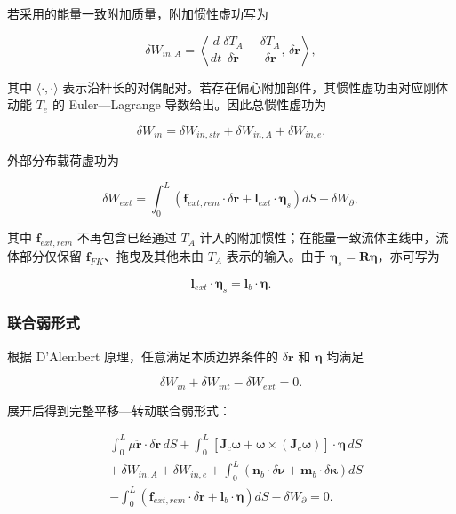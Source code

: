 若采用的能量一致附加质量，附加惯性虚功写为

\begin{equation}
\label{eq:rod-1-86}
\delta W_{in,A} = \left\langle \frac{d}{dt}\frac{\delta T_{A}}{\delta\dot{\mathbf{r}}} - \frac{\delta T_{A}}{\delta\mathbf{r}},\,\delta\mathbf{r} \right\rangle,
\end{equation}

其中 \(\langle \cdot , \cdot \rangle\) 表示沿杆长的对偶配对。若存在偏心附加部件，其惯性虚功由对应刚体动能 \(T_{e}\) 的 Euler---Lagrange 导数给出。因此总惯性虚功为

\begin{equation}
\label{eq:rod-1-87}
\delta W_{in} = \delta W_{in,str} + \delta W_{in,A} + \delta W_{in,e}.
\end{equation}

外部分布载荷虚功为

\begin{equation}
\label{eq:rod-1-88}
\delta W_{ext} = \int_{0}^{L}\left( \mathbf{f}_{ext,rem} \cdot \delta\mathbf{r} + \mathbf{l}_{ext} \cdot \bm{\eta}_{s} \right)dS + \delta W_{\partial},
\end{equation}

其中 \(\mathbf{f}_{ext,rem}\) 不再包含已经通过 \(T_{A}\) 计入的附加惯性；在能量一致流体主线中，流体部分仅保留 \(\mathbf{f}_{FK}\)、拖曳及其他未由 \(T_{A}\) 表示的输入。由于 \(\bm{\eta}_{s} = \mathbf{R}\bm{\eta}\)，亦可写为

\begin{equation}
\label{eq:rod-1-89}
\mathbf{l}_{ext} \cdot \bm{\eta}_{s} = \mathbf{l}_{b} \cdot \bm{\eta}.
\end{equation}

\subsubsection{联合弱形式}\label{sec:rod-1-5-4}

根据 D'Alembert 原理，任意满足本质边界条件的 \(\delta\mathbf{r}\) 和 \(\bm{\eta}\) 均满足

\begin{equation}
\label{eq:rod-1-90}
\delta W_{in} + \delta W_{int} - \delta W_{ext} = 0.
\end{equation}

展开后得到完整平移---转动联合弱形式：

\begin{equation}
\label{eq:rod-1-91}
\begin{matrix}
 & \int_{0}^{L}\mu\ddot{\mathbf{r}} \cdot \delta\mathbf{r}\, dS + \int_{0}^{L}\left\lbrack \mathbf{J}_{c}\dot{\bm{\omega}} + \bm{\omega} \times \left( \mathbf{J}_{c}\bm{\omega} \right) \right\rbrack \cdot \bm{\eta}\, dS \\
 & + \,\delta W_{in,A} + \delta W_{in,e} + \int_{0}^{L}\left( \mathbf{n}_{b} \cdot \delta\bm{\nu} + \mathbf{m}_{b} \cdot \delta\bm{\kappa} \right)dS \\
 & - \int_{0}^{L}\left( \mathbf{f}_{ext,rem} \cdot \delta\mathbf{r} + \mathbf{l}_{b} \cdot \bm{\eta} \right)dS - \delta W_{\partial} = 0.
\end{matrix}
\end{equation}

